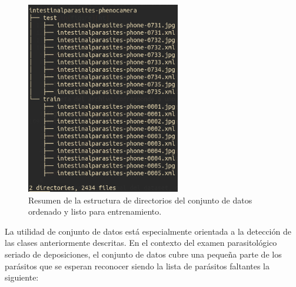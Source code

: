 \documentclass[letter,12pt]{report}
\begin{document}
\begin{figure}[H]
    \centering
    \includegraphics[width=0.6\textwidth]{treeDir}
    \caption{Resumen de la estructura de directorios del conjunto de datos ordenado y listo
    para entrenamiento.}
    \label{fig:carpetas}
\end{figure}

La utilidad de conjunto de datos está especialmente orientada a la detección de las clases
anteriormente descritas. En el contexto del examen parasitológico seriado de deposiciones,
el conjunto de datos cubre una pequeña parte de los parásitos que se esperan reconocer siendo
la lista de parásitos faltantes la siguiente:
\end{document}
